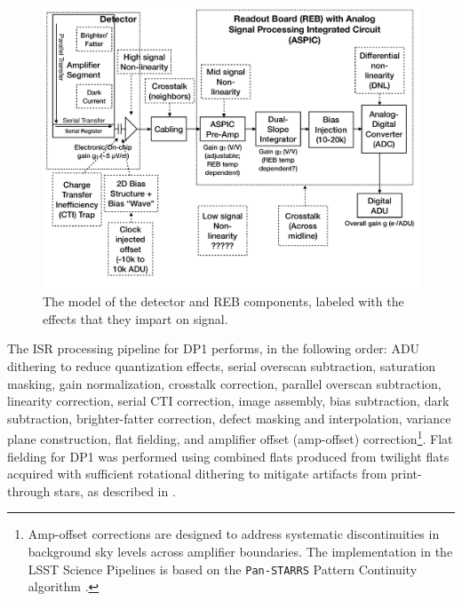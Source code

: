 \begin{figure}[htb]
  \centering
  \includegraphics[width=\linewidth]{calibration_boxes_detector_model}
  \caption{The model of the detector and REB components, labeled with the effects that they impart on signal.}
  \label{fig:isr_signal_chain}
\end{figure}

The \gls{ISR} processing pipeline for \gls{DP1} performs, in the following order: \gls{ADU} dithering to reduce quantization effects, serial overscan subtraction, saturation masking, gain normalization, crosstalk correction, parallel overscan subtraction, linearity correction, serial \gls{CTI} correction, image assembly, bias subtraction, dark subtraction, brighter-fatter correction, defect masking and interpolation, variance plane construction, flat fielding, and amplifier offset (amp-offset) correction\footnote{Amp-offset corrections are designed to address systematic discontinuities in background sky levels across amplifier boundaries. The implementation in the LSST Science Pipelines is based on the \texttt{Pan-STARRS} Pattern Continuity algorithm \citep{2020ApJS..251....4W}.}.
Flat fielding for \gls{DP1} was performed using combined flats produced from twilight flats acquired with sufficient rotational dithering to mitigate artifacts from print-through stars, as described in .